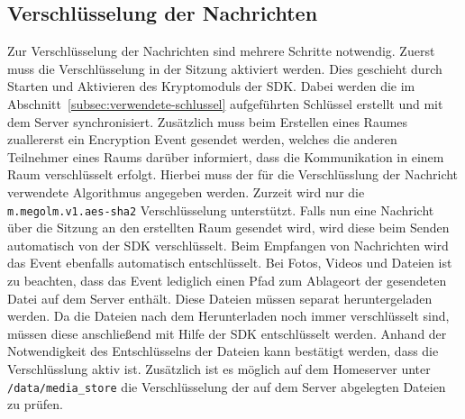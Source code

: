     \subsection{Verschlüsselung der Nachrichten}\label{subsec:verschlusselung-der-nachrichten}
    Zur Verschlüsselung der Nachrichten sind mehrere Schritte notwendig.
    Zuerst muss die Verschlüsselung in der Sitzung aktiviert werden.
    Dies geschieht durch Starten und Aktivieren des Kryptomoduls der SDK.
    Dabei werden die im Abschnitt~\ref{subsec:verwendete-schlussel} aufgeführten Schlüssel erstellt und mit dem Server synchronisiert.
    Zusätzlich muss beim Erstellen eines Raumes zuallererst ein Encryption Event gesendet werden, welches die anderen Teilnehmer eines Raums darüber informiert, dass die Kommunikation in einem Raum verschlüsselt erfolgt.
    Hierbei muss der für die Verschlüsslung der Nachricht verwendete Algorithmus angegeben werden.
    Zurzeit wird nur die \texttt{m.megolm.v1.aes-sha2} Verschlüsselung unterstützt.
    Falls nun eine Nachricht über die Sitzung an den erstellten Raum gesendet wird, wird diese beim Senden automatisch von der SDK verschlüsselt.
    Beim Empfangen von Nachrichten wird das Event ebenfalls automatisch entschlüsselt.
    Bei Fotos, Videos und Dateien ist zu beachten, dass das Event lediglich einen Pfad zum Ablageort der gesendeten Datei auf dem Server enthält.
    Diese Dateien müssen separat heruntergeladen werden.
    Da die Dateien nach dem Herunterladen noch immer verschlüsselt sind, müssen diese anschließend mit Hilfe der SDK entschlüsselt werden.
    Anhand der Notwendigkeit des Entschlüsselns der Dateien kann bestätigt werden, dass die Verschlüsslung aktiv ist.
    Zusätzlich ist es möglich auf dem Homeserver unter \texttt{/data/media\_store} die Verschlüsselung der auf dem Server abgelegten Dateien zu prüfen.

